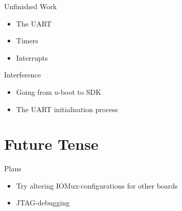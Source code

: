 \documentclass[9pt]{beamer}
\begin{document}
\begin{frame}{Unfinished Work}
 \begin{itemize}
 \item The UART
 \item Timers
 \item Interrupts
 \end{itemize}
\end{frame}

\begin{frame}{Interference}
 \begin{itemize}
 \item Going from u-boot to SDK
 \item The UART initialisation process
 \end{itemize}
\end{frame}

\section{Future Tense}

\begin{frame}{Plans}
 \begin{itemize}
 \item Try altering IOMux-configurations for other boards
 \item JTAG-debugging
 \end{itemize}
\end{frame}
\end{document}
